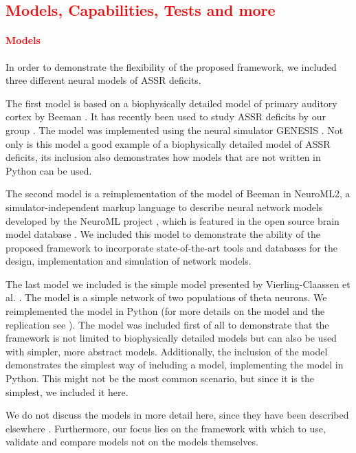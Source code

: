 \documentclass[a4paper,10pt]{article}
\begin{document}
\subsection{\textcolor{red}{Models, Capabilities, Tests and more}}



\paragraph{\textcolor{red}{Models}}
In order to demonstrate the flexibility of the proposed framework, we included three different neural models of ASSR deficits.

The first model is based on a biophysically detailed model of primary auditory cortex by Beeman \cite{Beeman2013}. It has recently been used to study 
ASSR deficits by our group \cite{Metzner2016}. The model was implemented using the neural simulator GENESIS \cite{Bower1992,Bower1998}. Not only is this model
a good example of a biophysically detailed model of ASSR deficits, its inclusion also demonstrates how models that are not written in Python can be used.

The second model is a reimplementation of the model of Beeman in NeuroML2, a simulator-independent markup language to describe neural network models developed by the
NeuroML project \cite{Cannon2014}, which is featured in the open source brain model database \cite{Gleeson2012}. We included this model to demonstrate the ability of the proposed framework
to incorporate state-of-the-art tools and databases for the design, implementation and simulation of network models.

The last model we included is the simple model presented by Vierling-Claassen et al. \cite{Vierling2008}. The model is a simple network of two populations of theta neurons. 
We reimplemented the model in Python (for more details on the model and the replication see \cite{Metzner2017}).
The model
was included first of all to demonstrate that the framework is not limited to biophysically detailed models but can also be used with simpler, more abstract models.
Additionally, the inclusion of the model demonstrates the simplest way of including a model, implementing the model in Python. This might not be the most common scenario, but 
since it is the simplest, we included it here.

We do not discuss the models in more detail here, since they have been described elsewhere \cite{Beeman2013,Metzner2016,Vierling2008,Metzner2017}. Furthermore, our focus lies on the framework with which to use, validate and compare
models not on the models themselves.
\end{document}
